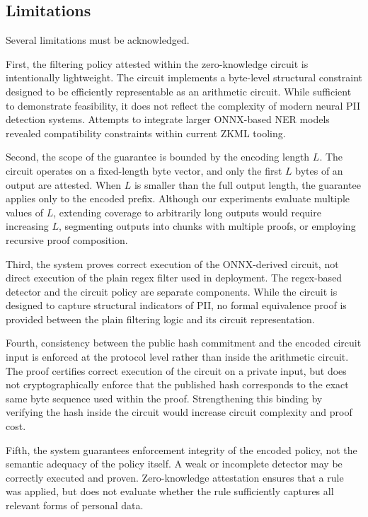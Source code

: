 \documentclass[10pt,conference,a4paper]{IEEEtran}
\begin{document}
\subsection{Limitations}

Several limitations must be acknowledged.

First, the filtering policy attested within the zero-knowledge circuit is intentionally lightweight. The circuit implements a byte-level structural constraint designed to be efficiently representable as an arithmetic circuit. While sufficient to demonstrate feasibility, it does not reflect the complexity of modern neural PII detection systems. Attempts to integrate larger ONNX-based NER models revealed compatibility constraints within current ZKML tooling. 

Second, the scope of the guarantee is bounded by the encoding length $L$. The circuit operates on a fixed-length byte vector, and only the first $L$ bytes of an output are attested. When $L$ is smaller than the full output length, the guarantee applies only to the encoded prefix. Although our experiments evaluate multiple values of $L$, extending coverage to arbitrarily long outputs would require increasing $L$, segmenting outputs into chunks with multiple proofs, or employing recursive proof composition.

Third, the system proves correct execution of the ONNX-derived circuit, not direct execution of the plain regex filter used in deployment. The regex-based detector and the circuit policy are separate components. While the circuit is designed to capture structural indicators of PII, no formal equivalence proof is provided between the plain filtering logic and its circuit representation.

Fourth, consistency between the public hash commitment and the encoded circuit input is enforced at the protocol level rather than inside the arithmetic circuit. The proof certifies correct execution of the circuit on a private input, but does not cryptographically enforce that the published hash corresponds to the exact same byte sequence used within the proof. Strengthening this binding by verifying the hash inside the circuit would increase circuit complexity and proof cost.

Fifth, the system guarantees enforcement integrity of the encoded policy, not the semantic adequacy of the policy itself. A weak or incomplete detector may be correctly executed and proven. Zero-knowledge attestation ensures that a rule was applied, but does not evaluate whether the rule sufficiently captures all relevant forms of personal data.
\end{document}
